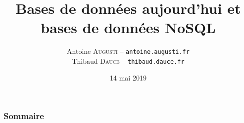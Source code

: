 \documentclass[handout]{beamer}
\title{
	Bases de données aujourd'hui et bases de données NoSQL
}
\author{
	Antoine \textsc{Augusti} -- \texttt{antoine.augusti.fr} \\
	\vspace{5px}
	Thibaud \textsc{Dauce} -- \texttt{thibaud.dauce.fr}
}
\date{14 mai 2019}
\begin{document}
	\begin{frame}[plain]
		\titlepage
	\end{frame}

	\begin{frame}[plain]
		\frametitle{Sommaire}
		\tableofcontents
	\end{frame}

		

		

		

		
\end{document}
